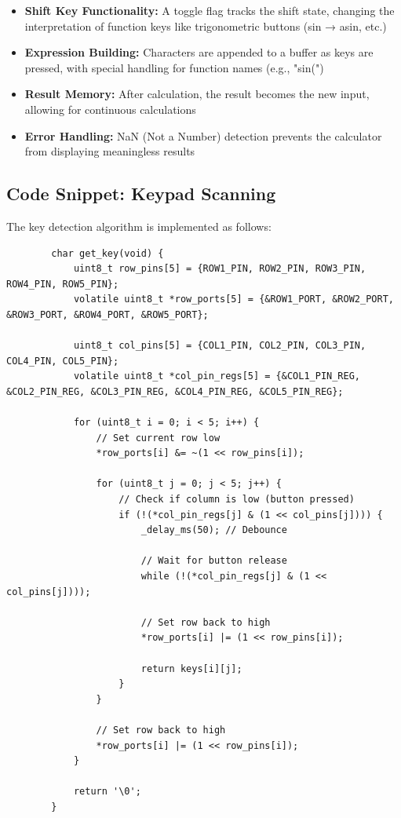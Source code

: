 \documentclass[12pt]{article}
\begin{document}
	\begin{itemize}
		\item \textbf{Shift Key Functionality:} A toggle flag tracks the shift state, changing the interpretation of function keys like trigonometric buttons (sin → asin, etc.)
		\item \textbf{Expression Building:} Characters are appended to a buffer as keys are pressed, with special handling for function names (e.g., "sin(")
		\item \textbf{Result Memory:} After calculation, the result becomes the new input, allowing for continuous calculations
		\item \textbf{Error Handling:} NaN (Not a Number) detection prevents the calculator from displaying meaningless results
	\end{itemize}
	
	\subsection{Code Snippet: Keypad Scanning}
	The key detection algorithm is implemented as follows:
	
	\begin{lstlisting}
		char get_key(void) {
			uint8_t row_pins[5] = {ROW1_PIN, ROW2_PIN, ROW3_PIN, ROW4_PIN, ROW5_PIN};
			volatile uint8_t *row_ports[5] = {&ROW1_PORT, &ROW2_PORT, &ROW3_PORT, &ROW4_PORT, &ROW5_PORT};
			
			uint8_t col_pins[5] = {COL1_PIN, COL2_PIN, COL3_PIN, COL4_PIN, COL5_PIN};
			volatile uint8_t *col_pin_regs[5] = {&COL1_PIN_REG, &COL2_PIN_REG, &COL3_PIN_REG, &COL4_PIN_REG, &COL5_PIN_REG};
			
			for (uint8_t i = 0; i < 5; i++) {
				// Set current row low
				*row_ports[i] &= ~(1 << row_pins[i]);
				
				for (uint8_t j = 0; j < 5; j++) {
					// Check if column is low (button pressed)
					if (!(*col_pin_regs[j] & (1 << col_pins[j]))) {
						_delay_ms(50); // Debounce
						
						// Wait for button release
						while (!(*col_pin_regs[j] & (1 << col_pins[j])));
						
						// Set row back to high
						*row_ports[i] |= (1 << row_pins[i]);
						
						return keys[i][j];
					}
				}
				
				// Set row back to high
				*row_ports[i] |= (1 << row_pins[i]);
			}
			
			return '\0';
		}
	\end{lstlisting}
	
\end{document}
